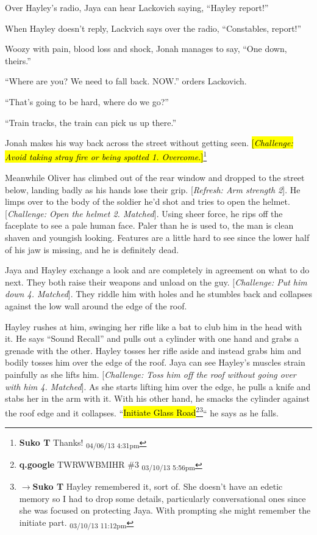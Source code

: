 Over Hayley's radio, Jaya can hear Lackovich saying, ``Hayley report!''



When Hayley doesn't reply, Lackvich says over the radio, ``Constables, report!''



Woozy with pain, blood loss and shock, Jonah manages to say, ``One down, theirs.''

``Where are you?  We need to fall back.  NOW.'' orders Lackovich.

``That's going to be hard, where do we go?''

``Train tracks, the train can pick us up there.''

Jonah makes his way back across the street without getting seen.  \hl{{[}\textit{Challenge: Avoid taking stray fire or being spotted 1.  Overcome.}{]}}\footnote{\textbf{Suko T }Thanks! \textsubscript{04/06/13 4:31pm}}



Meanwhile Oliver has climbed out of the rear window and dropped to the street below, landing badly as his hands lose their grip.  {[}\textit{Refresh: Arm strength 2}{]}.  He limps over to the body of the soldier he'd shot and tries to open the helmet.  {[}\textit{Challenge: Open the helmet 2.  Matched}{]}.  Using sheer force, he rips off the faceplate to see a pale human face.  Paler than he is used to, the man is clean shaven and youngish looking.  Features are a little hard to see since the lower half of his jaw is missing, and he is definitely dead.



Jaya and Hayley exchange a look and are completely in agreement on what to do next.  They both raise their weapons and unload on the guy.  {[}\textit{Challenge: Put him down 4.  Matched}{]}.  They riddle him with holes and he stumbles back and collapses against the low wall around the edge of the roof.



Hayley rushes at him, swinging her rifle like a bat to club him in the head with it.  He says ``Sound Recall'' and pulls out a cylinder with one hand and grabs a grenade with the other.  Hayley tosses her rifle aside and instead grabs him and bodily tosses him over the edge of the roof.  Jaya can see Hayley's muscles strain painfully as she lifts him.  {[}\textit{Challenge: Toss him off the roof without going over with him 4. Matched}{]}.  As she starts lifting him over the edge, he pulls a knife and stabs her in the arm with it.  With his other hand, he smacks the cylinder against the roof edge and it collapses.  ``\hl{Initiate Glass Road}\footnote{\textbf{q.google }TWRWWBMIHR \#3 \textsubscript{03/10/13 5:56pm}}\footnote{$\rightarrow$\textbf{Suko T }Hayley remembered it, sort of.  She doesn't have an edetic memory so I had to drop some details, particularly conversational ones since she was focused on protecting Jaya.  With prompting she might remember the initiate part. \textsubscript{03/10/13 11:12pm}}`` he says as he falls.



